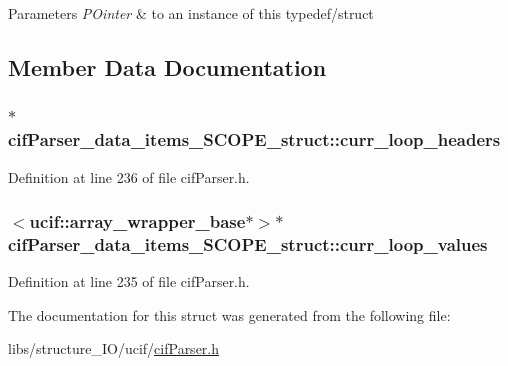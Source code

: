 \begin{DoxyParams}{Parameters}
{\em P\-Ointer} & to an instance of this typedef/struct \\
\hline
\end{DoxyParams}


\subsection{Member Data Documentation}
\hypertarget{structcif_parser__data__items___s_c_o_p_e__struct_a0bb9a6522eab35a3fb1cee05d6cf589d}{
\subsubsection[{curr\-\_\-loop\-\_\-headers}]{$\ast$ cif\-Parser\-\_\-data\-\_\-items\-\_\-\-S\-C\-O\-P\-E\-\_\-struct\-::curr\-\_\-loop\-\_\-headers}}\label{structcif_parser__data__items___s_c_o_p_e__struct_a0bb9a6522eab35a3fb1cee05d6cf589d}


Definition at line 236 of file cif\-Parser.\-h.

\hypertarget{structcif_parser__data__items___s_c_o_p_e__struct_a5cef2d38ec8f92aa915c3264652677c6}{
\subsubsection[{curr\-\_\-loop\-\_\-values}]{$<${\bf ucif\-::array\-\_\-wrapper\-\_\-base}$\ast$$>$$\ast$ cif\-Parser\-\_\-data\-\_\-items\-\_\-\-S\-C\-O\-P\-E\-\_\-struct\-::curr\-\_\-loop\-\_\-values}}\label{structcif_parser__data__items___s_c_o_p_e__struct_a5cef2d38ec8f92aa915c3264652677c6}


Definition at line 235 of file cif\-Parser.\-h.



The documentation for this struct was generated from the following file\-:\begin{DoxyCompactItemize}
\item 
libs/structure\-\_\-\-I\-O/ucif/\hyperlink{cif_parser_8h}{cif\-Parser.\-h}\end{DoxyCompactItemize}
